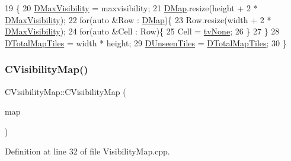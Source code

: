 \begin{DoxyCode}
19                                                                       \{
20     \hyperlink{classCVisibilityMap_ac8f71b9541c903fce0294d75daa1bbb1}{DMaxVisibility} = maxvisibility;
21     \hyperlink{classCVisibilityMap_ad217bc34f7a50dd357a3eeeb69cfdd85}{DMap}.resize(height + 2 * \hyperlink{classCVisibilityMap_ac8f71b9541c903fce0294d75daa1bbb1}{DMaxVisibility});
22     \textcolor{keywordflow}{for}(\textcolor{keyword}{auto} &Row : \hyperlink{classCVisibilityMap_ad217bc34f7a50dd357a3eeeb69cfdd85}{DMap})\{
23         Row.resize(width + 2 * \hyperlink{classCVisibilityMap_ac8f71b9541c903fce0294d75daa1bbb1}{DMaxVisibility});
24         \textcolor{keywordflow}{for}(\textcolor{keyword}{auto} &Cell : Row)\{
25             Cell = \hyperlink{classCVisibilityMap_a6665f905da08825adbb0eee7bd1f2f30aec106086bdc6328c8c6c02ee1bf32d2c}{tvNone};   
26         \}
27     \}
28     \hyperlink{classCVisibilityMap_a9bd6e633268535677aeefbd886c29485}{DTotalMapTiles} = width * height;
29     \hyperlink{classCVisibilityMap_a117ff39fef73ffd4cc4ba35c35e63171}{DUnseenTiles} = \hyperlink{classCVisibilityMap_a9bd6e633268535677aeefbd886c29485}{DTotalMapTiles}; 
30 \}
\end{DoxyCode}
\hypertarget{classCVisibilityMap_ad0a772b55a6ca65d2038a3d9a2f5c945}{}\label{classCVisibilityMap_ad0a772b55a6ca65d2038a3d9a2f5c945} 
\subsubsection{\texorpdfstring{C\+Visibility\+Map()}{CVisibilityMap()}\hspace{0.1cm}{\footnotesize\ttfamily [2/2]}}
{\footnotesize\ttfamily C\+Visibility\+Map\+::\+C\+Visibility\+Map (\begin{DoxyParamCaption}\item[{const \hyperlink{classCVisibilityMap}{C\+Visibility\+Map} \&}]{map }\end{DoxyParamCaption})}



Definition at line 32 of file Visibility\+Map.\+cpp.


